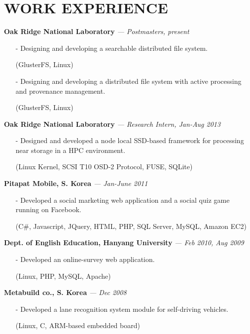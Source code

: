\section{WORK EXPERIENCE} 
\vspace{0.03in} 
{\bf Oak Ridge National Laboratory}
{\it \footnotesize --- Postmasters, present}
\begin{itemize}[leftmargin=*]
\setlength\itemsep{-0.02in}
 \item[-] Designing and developing a searchable distributed file system.
 \item[] {\small(GlusterFS, Linux)}
 \item[-] Designing and developing a distributed file system with
	  active processing and provenance management.
 \item[] {\small(GlusterFS, Linux)}
\end{itemize}
\vspace{-0.15in}

{\bf Oak Ridge National Laboratory}
{\it \footnotesize --- Research Intern, Jan-Aug 2013}
\begin{itemize}[leftmargin=*]
\setlength\itemsep{-0.02in}
 \item[-] Designed and developed a node local SSD-based framework for processing near
  storage in a HPC environment.
 \item[] {\small(Linux Kernel, SCSI T10 OSD-2 Protocol, FUSE, SQLite)}
\end{itemize}
\vspace{-0.15in}
{\bf Pitapat Mobile, S. Korea}
{\it \footnotesize --- Jan-June 2011}
\begin{itemize}[leftmargin=*]
\setlength\itemsep{-0.02in}
 \item[-] Developed a social marketing web application and a social quiz game running on
  Facebook.
 \item[] {\small(C\#, Javascript, JQuery, HTML, PHP, SQL Server, MySQL, Amazon EC2)}
\end{itemize}
\vspace{-0.15in}

{\bf Dept. of English Education, Hanyang University}
{\it \footnotesize --- Feb 2010, Aug 2009}
\begin{itemize}[leftmargin=*]
\setlength\itemsep{-0.02in}
 \item[-] Developed an online-survey web application.
 \item[] {\small(Linux, PHP, MySQL, Apache)}
\end{itemize}
\vspace{-0.15in}

{\bf Metabuild co., S. Korea}
{\it \footnotesize --- Dec 2008}
\begin{itemize}[leftmargin=*]
\setlength\itemsep{-0.02in}
 \item[-] Developed a lane recognition system module for self-driving vehicles.
 \item[] {\small(Linux, C, ARM-based embedded board)}
\end{itemize}

